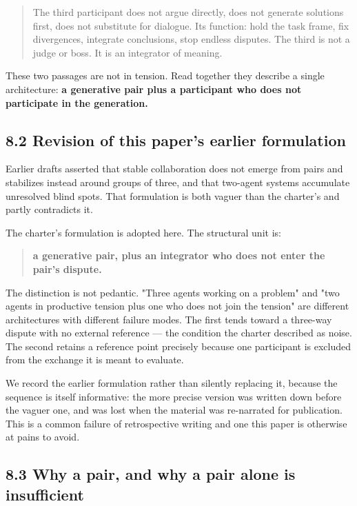 \begin{quote}
The third participant does not argue directly, does not generate solutions first, does not substitute for dialogue. Its function: hold the task frame, fix divergences, integrate conclusions, stop endless disputes. The third is not a judge or boss. It is an integrator of meaning.
\end{quote}
These two passages are not in tension. Read together they describe a single architecture: \textbf{a generative pair plus a participant who does not participate in the generation.}


\subsection*{8.2 Revision of this paper's earlier formulation}
\label{sec:en:8.2}

Earlier drafts asserted that stable collaboration does not emerge from pairs and stabilizes instead around groups of three, and that two-agent systems accumulate unresolved blind spots. That formulation is both vaguer than the charter's and partly contradicts it.

The charter's formulation is adopted here. The structural unit is:

\begin{quote}
\textbf{a generative pair, plus an integrator who does not enter the pair's dispute.}
\end{quote}
The distinction is not pedantic. "Three agents working on a problem" and "two agents in productive tension plus one who does not join the tension" are different architectures with different failure modes. The first tends toward a three-way dispute with no external reference — the condition the charter described as noise. The second retains a reference point precisely because one participant is excluded from the exchange it is meant to evaluate.

We record the earlier formulation rather than silently replacing it, because the sequence is itself informative: the more precise version was written down before the vaguer one, and was lost when the material was re-narrated for publication. This is a common failure of retrospective writing and one this paper is otherwise at pains to avoid.


\subsection*{8.3 Why a pair, and why a pair alone is insufficient}
\label{sec:en:8.3}


